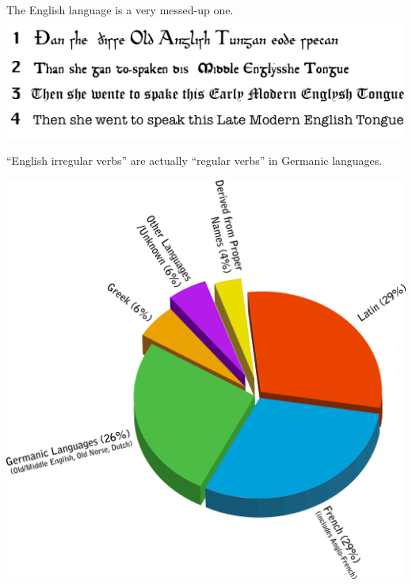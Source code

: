 \documentclass[11pt, handout]{beamer}
\begin{document}
\begin{frame}[allowframebreaks]{The English language is a very messed-up one.}
 \includegraphics[width=\textwidth]{old_English_to_modern_English.png}
 
 ``English irregular verbs'' are actually ``regular verbs'' in Germanic languages. 
 
 \includegraphics[width=.8\textwidth]{Origins_of_English_PieChart.png}
\end{frame}
\end{document}
